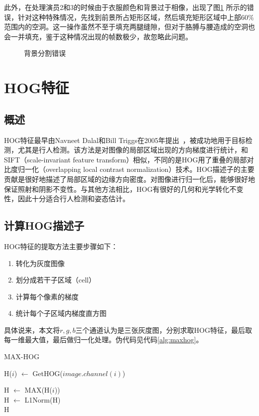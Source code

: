 此外，在处理演员2和3的时候由于衣服颜色和背景过于相像，出现了图\ref{fig:bkerr} 所示的错误，针对这种特殊情况，先找到前景所占矩形区域，然后填充矩形区域中上部60\%范围内的空洞。这一操作虽然不至于填充两腿缝隙，但对于胳膊与腰造成的空洞也会一并填充，鉴于这种情况出现的帧数极少，故忽略此问题。

\begin{figure}[htbp]
  \centering
  \caption{背景分割错误}\label{fig:bkerr}
\end{figure}

\section{HOG特征}
\subsection{概述}
HOG特征最早由Navneet Dalal和Bill Triggs在2005年提出~\cite{Dalal05histogramsof}，被成功地用于目标检测，尤其是行人检测。该方法是对图像的局部区域出现的方向梯度进行统计，和SIFT（scale-invariant feature transform）相似，不同的是HOG用了重叠的局部对比度归一化（overlapping local contrast normalization）技术。HOG描述子的主要贡献是很好地描述了局部区域的边缘方向密度。对图像进行归一化后，能够很好地保证照射和阴影不变性。与其他方法相比，HOG有很好的几何和光学转化不变性，因此十分适合行人检测和姿态估计。
\subsection{计算HOG描述子}
HOG特征的提取方法主要步骤如下：
\begin{enumerate}
  \item 转化为灰度图像
  \item 划分成若干子区域（cell）
  \item 计算每个像素的梯度
  \item 统计每个子区域内梯度直方图
\end{enumerate}

具体说来，本文将$r,g,b$三个通道认为是三张灰度图，分别求取HOG特征，最后取每一维最大值，最后做归一化处理。伪代码见代码\ref{alg:maxhog}。

\begin{algorithm}
  \caption{MAX-HOG}\label{alg:maxhog}
  \begin{algorithmic}[1]
        \STATE H($i$) $\leftarrow$ GetHOG($image.channel(i)$)
    \ENDFOR
    
      H $\leftarrow$ MAX(H($i$))\\
      H $\leftarrow$ L1Norm(H)\\
    \RETURN H
  \end{algorithmic}
\end{algorithm}


